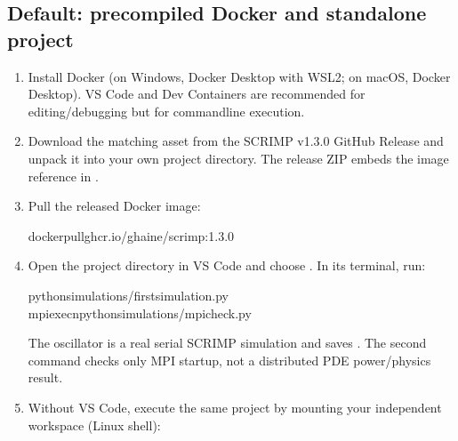 \documentclass[letterpaper,10pt,english]{sphinxmanual}
\begin{document}
\subsection{Default: precompiled Docker and standalone project}
\label{\detokenize{install:default-precompiled-docker-and-standalone-project}}\begin{enumerate}
%
\item {} 
\sphinxAtStartPar
Install Docker (on Windows, Docker Desktop with WSL2; on macOS,
Docker Desktop). VS Code and Dev Containers are recommended for
editing/debugging but  for command\sphinxhyphen{}line execution.

\item {} 
\sphinxAtStartPar
Download the matching
 asset from the SCRIMP v1.3.0
GitHub Release and unpack it into your own project directory. The
release ZIP embeds the  image reference in
.

\item {} 
\sphinxAtStartPar
Pull the released Docker image:

\begin{sphinxVerbatim}[commandchars=\\\{\}]
dockerpullghcr.io/g\PYGZhy{}haine/scrimp:1.3.0
\end{sphinxVerbatim}

\item {} 
\sphinxAtStartPar
Open the project directory in VS Code and choose
. In its terminal, run:

\begin{sphinxVerbatim}[commandchars=\\\{\}]
pythonsimulations/first\PYGZus{}simulation.py
mpiexec\PYGZhy{}npythonsimulations/mpi\PYGZus{}check.py
\end{sphinxVerbatim}

\sphinxAtStartPar
The oscillator is a real serial SCRIMP simulation and saves
 . The second command
checks only MPI startup, not a distributed PDE power/physics result.

\item {} 
\sphinxAtStartPar
Without VS Code, execute the same project by mounting your
independent workspace (Linux shell):


\end{enumerate}
\end{document}
